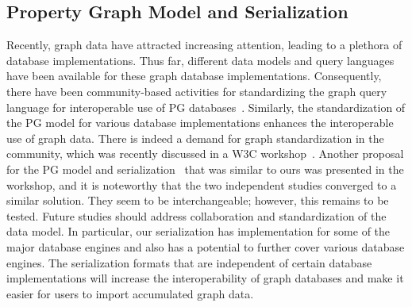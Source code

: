 \documentclass[runningheads]{llncs}
\begin{document}
\subsection{Property Graph Model and Serialization}
Recently, graph data have attracted increasing attention, leading to a plethora of database implementations. 
Thus far, different data models and query languages have been available for these graph database implementations.
Consequently, there have been community-based activities for standardizing the graph query language for interoperable use of PG databases~\cite{angles3}. Similarly, the standardization of the PG model for various database implementations enhances the interoperable use of graph data. There is indeed a demand for graph standardization in the community, which was recently discussed in a W3C workshop~\cite{w3c}. Another proposal for the PG model and serialization~\cite{tomaszuk} that was similar to ours was presented in the workshop, and it is noteworthy that the two independent studies converged to a similar solution. They seem to be interchangeable; however, this remains to be tested. Future studies should address collaboration and standardization of the data model.
In particular, our serialization has implementation for some of the major database engines and also has a potential to further cover various database engines. 
The serialization formats that are independent of certain database implementations will increase the interoperability of graph databases and make it easier for users to import accumulated graph data.
\end{document}

